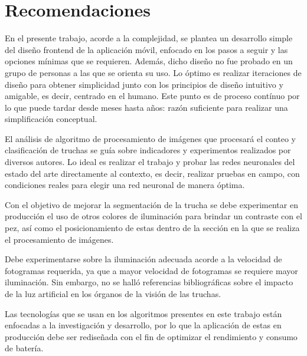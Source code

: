 
\pagestyle{myportland}
\doublespacing
\chapter*{\centering \large Recomendaciones}
\thispagestyle{myportland}

En el presente trabajo, acorde a la complejidad, se plantea un desarrollo simple del diseño frontend de la aplicación móvil, enfocado en los pasos a seguir y las opciones mínimas que se requieren. Además, dicho diseño no fue probado en un grupo de personas a las que se orienta su uso. Lo óptimo es realizar iteraciones de diseño para obtener simplicidad junto con los principios de diseño intuitivo y amigable, es decir, centrado en el humano. Este punto es de proceso contínuo por lo que puede tardar desde meses hasta años: razón suficiente para realizar una simplificación conceptual.

El análisis de algoritmo de procesamiento de imágenes que procesará el conteo y clasificación de truchas se guía sobre indicadores y experimentos realizados por diversos autores. Lo ideal es realizar el trabajo y probar las redes neuronales del estado del arte directamente al contexto, es decir, realizar pruebas en campo, con condiciones reales para elegir una red neuronal de manera óptima.

Con el objetivo de mejorar la segmentación de la trucha se debe experimentar en producción el uso de otros colores de iluminación para brindar un contraste con el pez, así como el posicionamiento de estas dentro de la sección en la que se realiza el procesamiento de imágenes. 

Debe experimentarse sobre la iluminación adecuada acorde a la velocidad de fotogramas requerida, ya que a mayor velocidad de fotogramas se requiere mayor iluminación. Sin embargo, no se halló referencias bibliográficas sobre el impacto de la luz artificial en los órganos de la visión de las truchas.

Las tecnologías que se usan en los algoritmos presentes en este trabajo están enfocadas a la investigación y desarrollo, por lo que la aplicación de estas en producción debe ser rediseñada con el fin de optimizar el rendimiento y consumo de batería.

